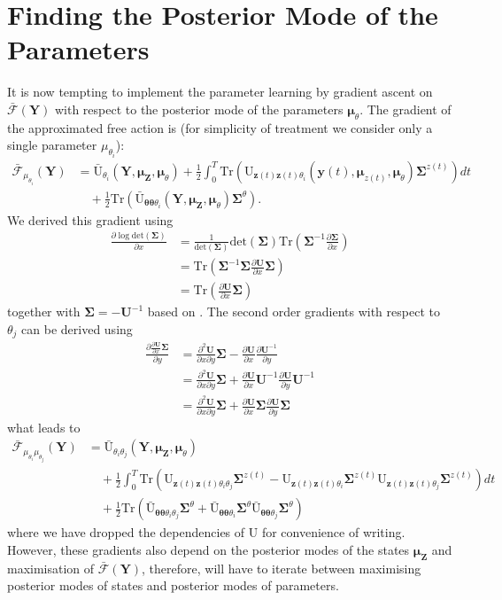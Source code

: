 \documentclass[a4paper,10pt]{article}
\newcommand{\bs}[1]{\mathbf{#1}}					%
\newcommand{\bgs}[1]{\boldsymbol{#1}}				%
\newcommand{\pd}[2]{\frac{\partial #1}{\partial #2}} 	%
\newcommand{\ppd}[3]{\frac{\partial^2 #1}{\partial #2 \partial #3}} %
\newcommand{\trace}[1]{\mathrm{Tr}\left(#1\right)}					%
\renewcommand{\ss}{z}         %
\newcommand{\so}{y}         %
\renewcommand{\sp}{\theta}    %
\newcommand{\ps}{\bs{\ss}}    %
\newcommand{\po}{\bs{\so}}    %
\newcommand{\pp}{\bgs{\sp}} %
\newcommand{\Ps}{\bs{Z}}    %
\newcommand{\Po}{\bs{Y}}    %
\newcommand{\U}{\mathrm{U}}			%
\newcommand{\Ua}{\bar{\mathrm{U}}}		%
\newcommand{\Fa}{\bar{\mathcal{F}}}		%
\newcommand{\Cov}{\bgs{\Sigma}}			%
\renewcommand{\det}[1]{\mathrm{det}(#1)}	%
\begin{document}
\section{Finding the Posterior Mode of the Parameters}
It is now tempting to implement the parameter learning by gradient ascent on $\Fa(\Po)$ with respect to the posterior mode of the parameters $\bgs{\mu}_\sp$. The gradient of the approximated free action is (for simplicity of treatment we consider only a single parameter $\mu_{\sp_i}$):
\begin{align}
    \Fa_{\mu_{\sp_i}}(\Po) &= \Ua_{\sp_i}(\Po,\bgs{\mu}_\Ps,\bgs{\mu}_\sp) + \frac{1}{2}\int_0^T \trace{\U_{\ps(t)\ps(t)\sp_i}(\po(t),\bgs{\mu}_{\ss(t)},\bgs{\mu}_\sp)\Cov^{\ss(t)}}dt\nonumber\\
    &\quad \label{eq:approxFreeActionDp} + \frac{1}{2}\trace{\Ua_{\pp\pp\sp_i}(\Po,\bgs{\mu}_\Ps,\bgs{\mu}_\sp)\Cov^\sp}.
\end{align}
We derived this gradient using 
\begin{align}
    \pd{\log \det{\Cov}}{x} &= \frac{1}{\det{\Cov}}\det{\Cov}\trace{\Cov^{-1}\pd{\Cov}{x}}\\
    &= \trace{\Cov^{-1}\Cov\pd{\bs{U}}{x}\Cov}\\
    &= \trace{\pd{\bs{U}}{x}\Cov}
\end{align}
together with $\Cov = -\bs{U}^{-1}$ based on \citep[][eqs. (41) and (53)]{Petersen2008}. The second order gradients with respect to $\sp_j$ can be derived using
\begin{align}
    \pd{\pd{\bs{U}}{x}\Cov}{y} &= \ppd{\bs{U}}{x}{y}\Cov - \pd{\bs{U}}{x}\pd{\bs{U}^{-1}}{y}\\
    &= \ppd{\bs{U}}{x}{y}\Cov + \pd{\bs{U}}{x}\bs{U}^{-1}\pd{\bs{U}}{y}\bs{U}^{-1}\\
    &= \ppd{\bs{U}}{x}{y}\Cov + \pd{\bs{U}}{x}\Cov\pd{\bs{U}}{y}\Cov
\end{align}
what leads to
\begin{align}
    \Fa_{\mu_{\sp_i}\mu_{\sp_j}}(\Po) &= \Ua_{\sp_i\sp_j}(\Po,\bgs{\mu}_\Ps,\bgs{\mu}_\sp) \nonumber\\
    &\quad + \frac{1}{2}\int_0^T \trace{\U_{\ps(t)\ps(t)\sp_i\sp_j}\Cov^{\ss(t)} - \U_{\ps(t)\ps(t)\sp_i}\Cov^{\ss(t)}\U_{\ps(t)\ps(t)\sp_j}\Cov^{\ss(t)}} dt\nonumber\\
    &\quad \label{eq:approxFreeActionDpDp} + \frac{1}{2}\trace{\Ua_{\pp\pp\sp_i\sp_j}\Cov^\sp + \Ua_{\pp\pp\sp_i}\Cov^\sp\Ua_{\pp\pp\sp_j}\Cov^\sp}
\end{align}
where we have dropped the dependencies of $\U$ for convenience of writing. However, these gradients also depend on the posterior modes of the states $\bgs{\mu}_\Ps$ and maximisation of $\Fa(\Po)$, therefore, will have to iterate between maximising posterior modes of states and posterior modes of parameters.
\end{document}
